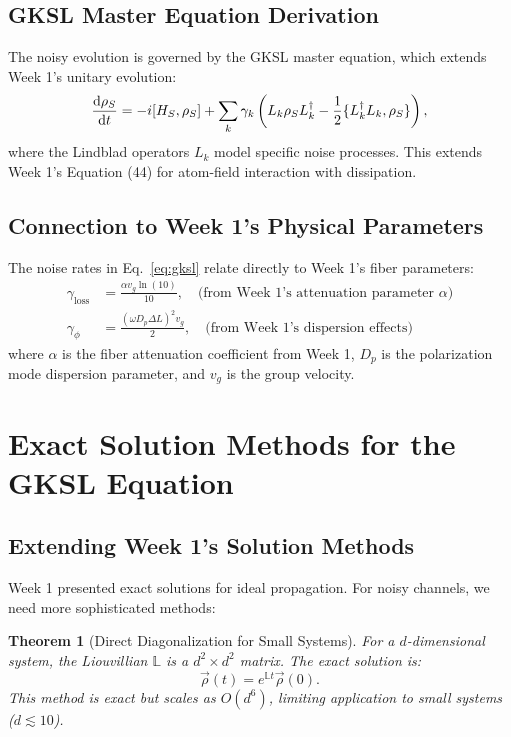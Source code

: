 \documentclass[12pt,a4paper]{article}
\newtheorem{theorem}{Theorem}[section]
\begin{document}
\subsection{GKSL Master Equation Derivation}
The noisy evolution is governed by the GKSL master equation, which extends Week 1's unitary evolution:
\begin{equation}
    \dv{\rho_S}{t} = -i[H_S, \rho_S] + \sum_{k} \gamma_k \left( L_k \rho_S L_k^\dagger - \frac{1}{2} \{L_k^\dagger L_k, \rho_S\} \right),
    \label{eq:gksl}
\end{equation}
where the Lindblad operators $L_k$ model specific noise processes. This extends Week 1's Equation (44) for atom-field interaction with dissipation.

\subsection{Connection to Week 1's Physical Parameters}
The noise rates in Eq.~\eqref{eq:gksl} relate directly to Week 1's fiber parameters:
\begin{align}
    \gamma_{\text{loss}} &= \frac{\alpha v_g \ln(10)}{10}, \quad \text{(from Week 1's attenuation parameter $\alpha$)} \\
    \gamma_\phi &= \frac{(\omega D_p \Delta L)^2 v_g}{2}, \quad \text{(from Week 1's dispersion effects)}
\end{align}
where $\alpha$ is the fiber attenuation coefficient from Week 1, $D_p$ is the polarization mode dispersion parameter, and $v_g$ is the group velocity.

\section{Exact Solution Methods for the GKSL Equation}
\label{sec:exact_solutions}

\subsection{Extending Week 1's Solution Methods}
Week 1 presented exact solutions for ideal propagation. For noisy channels, we need more sophisticated methods:

\begin{theorem}[Direct Diagonalization for Small Systems]
    For a $d$-dimensional system, the Liouvillian $\mathbb{L}$ is a $d^2 \times d^2$ matrix. The exact solution is:
    \[
    \vec{\rho}(t) = e^{\mathbb{L}t} \vec{\rho}(0).
    \]
    This method is exact but scales as $O(d^6)$, limiting application to small systems ($d \lesssim 10$).
\end{theorem}
\end{document}
